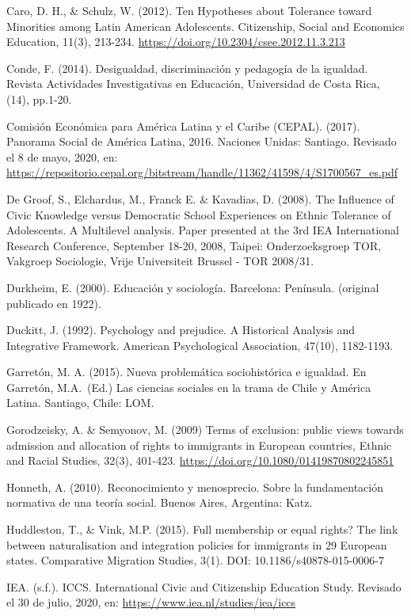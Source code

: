 \documentclass[12pt,twoside]{templates/facsothesis}
\begin{document}
Caro, D. H., \& Schulz, W. (2012). Ten Hypotheses about Tolerance toward Minorities among Latin American Adolescents. Citizenship, Social and Economics Education, 11(3), 213-234. \url{https://doi.org/10.2304/csee.2012.11.3.213}

Conde, F. (2014). Desigualdad, discriminación y pedagogía de la igualdad. Revista Actividades Investigativas en Educación, Universidad de Costa Rica, (14), pp.1-20.

Comisión Económica para América Latina y el Caribe (CEPAL). (2017). Panorama Social de América Latina, 2016. Naciones Unidas: Santiago. Revisado el 8 de mayo, 2020, en: \url{https://repositorio.cepal.org/bitstream/handle/11362/41598/4/S1700567_es.pdf}

De Groof, S., Elchardus, M., Franck E. \& Kavadias, D. (2008). The Influence of Civic Knowledge versus Democratic School Experiences on Ethnic Tolerance of Adolescents. A Multilevel analysis. Paper presented at the 3rd IEA International Research Conference, September 18-20, 2008, Taipei: Onderzoeksgroep TOR, Vakgroep Sociologie, Vrije Universiteit Brussel - TOR 2008/31.

Durkheim, E. (2000). Educación y sociología. Barcelona: Península. (original publicado en 1922).

Duckitt, J. (1992). Psychology and prejudice. A Historical Analysis and Integrative Framework. American Psychological Association, 47(10), 1182-1193.

Garretón, M. A. (2015). Nueva problemática sociohistórica e igualdad. En Garretón, M.A.~(Ed.) Las ciencias sociales en la trama de Chile y América Latina. Santiago, Chile: LOM.

Gorodzeisky, A. \& Semyonov, M. (2009) Terms of exclusion: public views towards admission and allocation of rights to immigrants in European countries, Ethnic and Racial Studies, 32(3), 401-423. \url{https://doi.org/10.1080/01419870802245851}

Honneth, A. (2010). Reconocimiento y menosprecio. Sobre la fundamentación normativa de una teoría social. Buenos Aires, Argentina: Katz.

Huddleston, T., \& Vink, M.P. (2015). Full membership or equal rights? The link between naturalisation and integration policies for immigrants in 29 European states. Comparative Migration Studies, 3(1). DOI: 10.1186/s40878-015-0006-7

IEA. (s.f.). ICCS. International Civic and Citizenship Education Study. Revisado el 30 de julio, 2020, en: \url{https://www.iea.nl/studies/iea/iccs}
\end{document}
